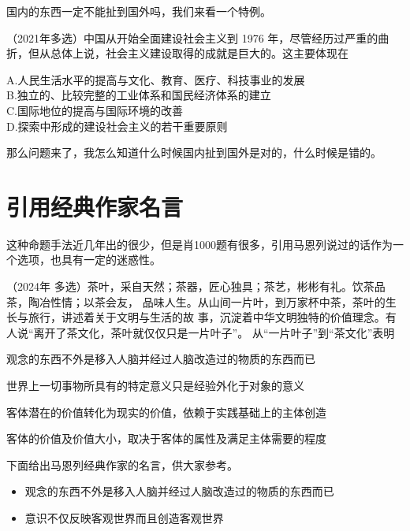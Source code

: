 \documentclass[lang=cn,newtx,10pt,scheme=chinese,pad,twocol]{zznote}
\begin{document}
\begin{note}
	国内的东西一定不能扯到国外吗，我们来看一个特例。

\end{note}
\begin{lemma}

	（2021年多选）中国从开始全面建设社会主义到 1976 年，尽管经历过严重的曲折，但从总体上说，社会主义建设取得的成就是巨大的。这主要体现在

	A.\;\;人民生活水平的提高与文化、教育、医疗、科技事业的发展\\
	B.\;\;独立的、比较完整的工业体系和国民经济体系的建立\\
	C.\;\;国际地位的提高与国际环境的改善\\
	D.\;\;探索中形成的建设社会主义的若干重要原则
\end{lemma}
那么问题来了，我怎么知道什么时候国内扯到国外是对的，什么时候是错的。



\section{引用经典作家名言}
\begin{definition}
	这种命题手法近几年出的很少，但是肖1000题有很多，引用马恩列说过的话作为一个选项，也具有一定的迷惑性。
\end{definition}



\begin{example} （2024年 多选）茶叶，采自天然；茶器，匠心独具；茶艺，彬彬有礼。饮茶品茶，陶冶性情；以茶会友， 品味人生。从山间一片叶，到万家杯中茶，茶叶的生长与旅行，讲述着关于文明与生活的故 事，沉淀着中华文明独特的价值理念。有人说“离开了茶文化，茶叶就仅仅只是一片叶子”。 从“一片叶子”到“茶文化”表明
	\begin{choice}
		\item 观念的东西不外是移入人脑并经过人脑改造过的物质的东西而已
		\item 世界上一切事物所具有的特定意义只是经验外化于对象的意义
		\item 客体潜在的价值转化为现实的价值，依赖于实践基础上的主体创造
		\item 客体的价值及价值大小，取决于客体的属性及满足主体需要的程度
	\end{choice}
\end{example}


\begin{assumption}
	下面给出马恩列经典作家的名言，供大家参考。
	\begin{itemize}
		\item 观念的东西不外是移入人脑并经过人脑改造过的物质的东西而已
		\item 意识不仅反映客观世界而且创造客观世界
	\end{itemize}
\end{assumption}
\end{document}
